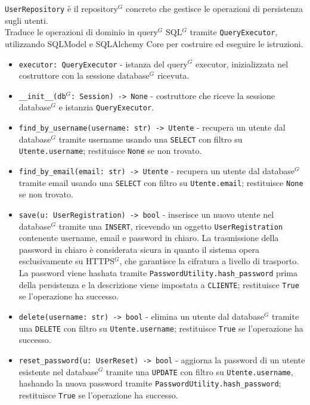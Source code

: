 \texttt{UserRepository} è il repository$^G$ concreto che gestisce le operazioni di persistenza sugli utenti.\\
Traduce le operazioni di dominio in query$^G$ SQL$^G$ tramite \texttt{QueryExecutor}, utilizzando SQLModel e SQLAlchemy Core per costruire ed eseguire le istruzioni.

\begin{itemize}
	\item \texttt{executor: QueryExecutor} - istanza del query$^G$ executor, inizializzata nel costruttore con la sessione database$^G$ ricevuta.
\end{itemize}

\begin{itemize}
	\item \texttt{\_\_init\_\_(db$^G$: Session) -> None} - costruttore che riceve la sessione database$^G$ e istanzia \texttt{QueryExecutor}.
	\item \texttt{find\_by\_username(username: str) -> Utente} - recupera un utente dal database$^G$ tramite username usando una \texttt{SELECT} con filtro su \texttt{Utente.username}; restituisce \texttt{None} se non trovato.
	\item \texttt{find\_by\_email(email: str) -> Utente} - recupera un utente dal database$^G$ tramite email usando una \texttt{SELECT} con filtro su \texttt{Utente.email}; restituisce \texttt{None} se non trovato.
	\item \texttt{save(u: UserRegistration) -> bool} - inserisce un nuovo utente nel database$^G$ tramite una \texttt{INSERT}, ricevendo un oggetto \texttt{UserRegistration} contenente username, email e password in chiaro. La trasmissione della password in chiaro è considerata sicura in quanto il sistema opera esclusivamente su HTTPS$^G$, che garantisce la cifratura a livello di trasporto. La password viene hashata tramite \texttt{PasswordUtility.hash\_password} prima della persistenza e la descrizione viene impostata a \texttt{CLIENTE}; restituisce \texttt{True} se l'operazione ha successo.
	\item \texttt{delete(username: str) -> bool} - elimina un utente dal database$^G$ tramite una \texttt{DELETE} con filtro su \texttt{Utente.username}; restituisce \texttt{True} se l'operazione ha successo.
	\item \texttt{reset\_password(u: UserReset) -> bool} - aggiorna la password di un utente esistente nel database$^G$ tramite una \texttt{UPDATE} con filtro su \texttt{Utente.username}, hashando la nuova password tramite \texttt{PasswordUtility.hash\_password}; restituisce \texttt{True} se l'operazione ha successo.
\end{itemize}

